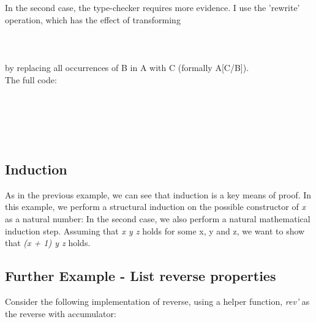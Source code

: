 \documentclass[12pt,twoside,notitlepage]{report}
\begin{document}
In the second case, the type-checker requires more evidence. I use the 'rewrite' operation, which has the effect of transforming\\\\
\indent {}     \\\\
by replacing all occurrences of B in A with C (formally A[C/B]). \\ 
The full code: \\\\
\begin{code}
\>[0]\<[2]%
\>[2] \AgdaSymbol{:} \AgdaSymbol{(}   \AgdaSymbol{:} \AgdaSymbol{)}  \AgdaSymbol{(} \AgdaPrimitive{+} \AgdaSymbol{(} \AgdaPrimitive{+} \AgdaSymbol{))}  \AgdaSymbol{((} \AgdaPrimitive{+} \AgdaSymbol{)} \AgdaPrimitive{+} \AgdaSymbol{)}\<%
\\
\>[0]\<[2]%
\>[2]    \AgdaSymbol{=} \<%
\\
\>[0]\<[2]%
\>[2] \AgdaSymbol{(} \AgdaSymbol{)}        \AgdaSymbol{=} \<%
\\
\end{code}

\subsection{Induction}

As in the previous example, we can see that induction is a key means of proof. In this example, we perform a structural induction on the possible constructor of \textit{x} as a natural number:
 In the second case, we also perform a natural mathematical induction step. Assuming that  \textit{x y z} holds for some x, y and z, we want to show that  \textit{(x + 1) y z} holds.

\subsection{Further Example - List reverse properties}
Consider the following implementation of reverse, using a helper function, \textit{rev'} as the reverse with accumulator: 
\end{document}
